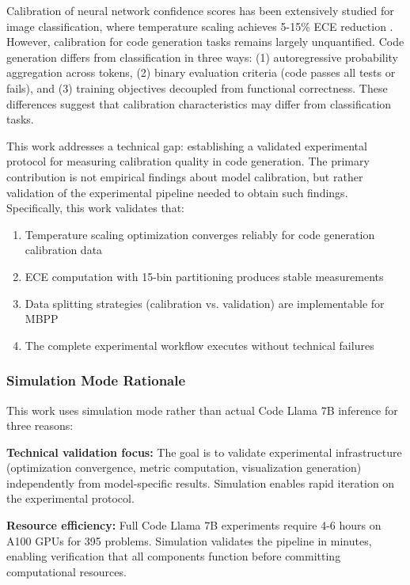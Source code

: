 
Calibration of neural network confidence scores has been extensively studied for image classification, where temperature scaling achieves 5-15\% ECE reduction \citep{guo2017calibration}. However, calibration for code generation tasks remains largely unquantified. Code generation differs from classification in three ways: (1) autoregressive probability aggregation across tokens, (2) binary evaluation criteria (code passes all tests or fails), and (3) training objectives decoupled from functional correctness. These differences suggest that calibration characteristics may differ from classification tasks.

This work addresses a technical gap: establishing a validated experimental protocol for measuring calibration quality in code generation. The primary contribution is not empirical findings about model calibration, but rather validation of the experimental pipeline needed to obtain such findings. Specifically, this work validates that:

\begin{enumerate}
\item Temperature scaling optimization converges reliably for code generation calibration data
\item ECE computation with 15-bin partitioning produces stable measurements
\item Data splitting strategies (calibration vs. validation) are implementable for MBPP
\item The complete experimental workflow executes without technical failures
\end{enumerate}

\subsubsection{Simulation Mode Rationale}

This work uses simulation mode rather than actual Code Llama 7B inference for three reasons:

\textbf{Technical validation focus:} The goal is to validate experimental infrastructure (optimization convergence, metric computation, visualization generation) independently from model-specific results. Simulation enables rapid iteration on the experimental protocol.

\textbf{Resource efficiency:} Full Code Llama 7B experiments require 4-6 hours on A100 GPUs for 395 problems. Simulation validates the pipeline in minutes, enabling verification that all components function before committing computational resources.

